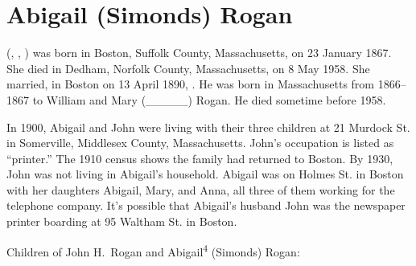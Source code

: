 \section{Abigail (Simonds) Rogan}\label{per:Abigail4Simonds}

 (, , ) was born in Boston, Suffolk County, Massachusetts, on 23 January 1867.\cite{Abigail4SimondsBirth} She died in Dedham, Norfolk County, Massachusetts, on 8 May 1958.\cite{Abigail4SimondsDeath:1} She married, in Boston on 13 April 1890, . He was born in Massachusetts from 1866--1867 to William and Mary (\_\_\_\_\_) Rogan.\cite{Census1880JohnRogan} He died sometime before 1958.\cite{Abigail4SimondsDeath:2}

In 1900, Abigail and John were living with their three children at 21 Murdock St. in Somerville, Middlesex County, Massachusetts. John's occupation is listed as ``printer.''\cite{Census1900AbigailSimonds} The 1910 census shows the family had returned to Boston.\cite{Census1910AbigailSimonds} By 1930, John was not living in Abigail's household. Abigail was on Holmes St. in Boston with her daughters Abigail, Mary, and Anna, all three of them working for the telephone company.\cite{Census1930AbigailSimonds} It's possible that Abigail's husband John was the newspaper printer boarding at 95 Waltham St. in Boston.\cite{Census1930JohnRogan}

\begin{KidsIntro}
	Children of John H.\ Rogan and Abigail\textsuperscript{4} (Simonds) Rogan:
\end{KidsIntro}

